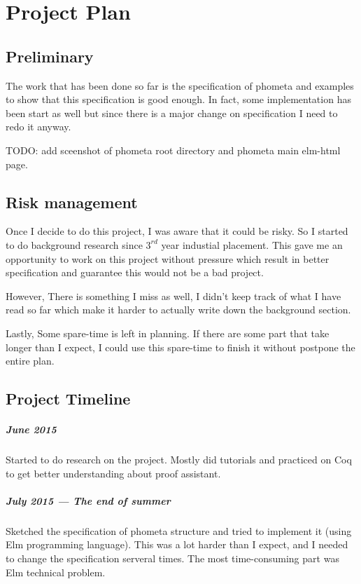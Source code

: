

\chapter{Project Plan}

\section{Preliminary}

The work that has been done so far is the specification of phometa and examples to show that this specification is good enough. In fact, some implementation has been start as well but since there is a major change on specification I need to redo it anyway.

TODO: add sceenshot of phometa root directory and phometa main elm-html page.

\section{Risk management}
Once I decide to do this project, I was aware that it could be risky. So I started to do background research since $3^{rd}$ year industial placement. This gave me an opportunity to work on this project without pressure which result in better specification and guarantee this would not be a bad project.

However, There is something I miss as well, I didn't keep track of what I have read so far which make it harder to actually write down the background section.

Lastly, Some spare-time is left in planning. If there are some part that take longer than I expect, I could use this spare-time to finish it without postpone the entire plan.

\section{Project Timeline}

\paragraph{June 2015} Started to do research on the project. Mostly did tutorials and practiced on Coq to get better understanding about proof assistant.

\paragraph{July 2015 --- The end of summer} Sketched the specification of phometa structure and tried to implement it (using Elm programming language).
This was a lot harder than I expect, and I needed to change the specification serveral times. The most time-consuming part was Elm technical problem.

